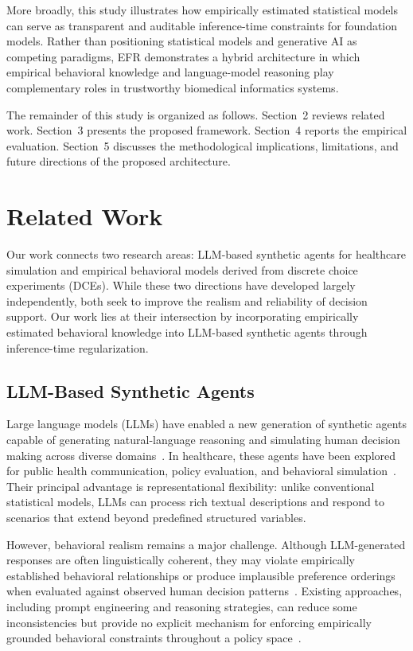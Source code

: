 \documentclass[11pt]{article}
\begin{document}
More broadly, this study illustrates how empirically estimated statistical models can serve as transparent and auditable inference-time constraints for foundation models. Rather than positioning statistical models and generative AI as competing paradigms, EFR demonstrates a hybrid architecture in which empirical behavioral knowledge and language-model reasoning play complementary roles in trustworthy biomedical informatics systems.

The remainder of this study is organized as follows. Section~2 reviews related work. Section~3 presents the proposed framework. Section~4 reports the empirical evaluation. Section~5 discusses the methodological implications, limitations, and future directions of the proposed architecture.

\section{Related Work}

Our work connects two research areas: LLM-based synthetic agents for healthcare simulation and empirical behavioral models derived from discrete choice experiments (DCEs). While these two directions have developed largely independently, both seek to improve the realism and reliability of decision support. Our work lies at their intersection by incorporating empirically estimated behavioral knowledge into LLM-based synthetic agents through inference-time regularization.

\subsection{LLM-Based Synthetic Agents}

Large language models (LLMs) have enabled a new generation of synthetic agents capable of generating natural-language reasoning and simulating human decision making across diverse domains~\citep{Bommasani2021, Park2023a, Mu2024, NLG2026review}. In healthcare, these agents have been explored for public health communication, policy evaluation, and behavioral simulation~\citep{Sehgal2025, Gullison2025, Wang2024c, Keerthana2025}. Their principal advantage is representational flexibility: unlike conventional statistical models, LLMs can process rich textual descriptions and respond to scenarios that extend beyond predefined structured variables.

However, behavioral realism remains a major challenge. Although LLM-generated responses are often linguistically coherent, they may violate empirically established behavioral relationships or produce implausible preference orderings when evaluated against observed human decision patterns~\citep{Aher2022TuringExperiments, Horton2023, hintze2025nonlinear, Wysocka2024, Chuang2024}. Existing approaches, including prompt engineering and reasoning strategies, can reduce some inconsistencies but provide no explicit mechanism for enforcing empirically grounded behavioral constraints throughout a policy space~\citep{wang2025simulate, wang2025heating}.
\end{document}
